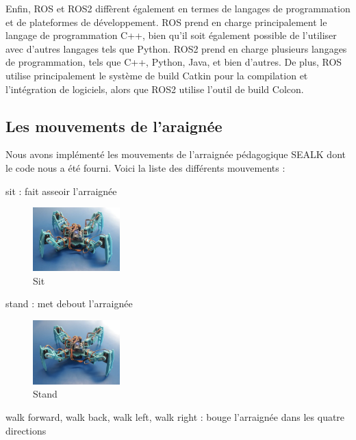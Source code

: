 Enfin, ROS et ROS2 diffèrent également en termes de langages de programmation et de plateformes de développement. 
ROS prend en charge principalement le langage de programmation C++, bien qu'il soit également possible de l'utiliser avec d'autres 
langages tels que Python. ROS2 prend en charge plusieurs langages de programmation, tels que C++, Python, Java, et bien d'autres. 
De plus, ROS utilise principalement le système de build Catkin pour la compilation et l'intégration de logiciels, alors que 
ROS2 utilise l'outil de build Colcon. 

			\subsection{Les mouvements de l'araignée}
			\label{les_mouvements}

Nous avons implémenté les mouvements de l'arraignée pédagogique SEALK dont le code nous a été fourni. Voici la liste des différents mouvements :	

sit : fait asseoir l'arraignée

\begin{figure}[H]
	\begin{center}
		\includegraphics[width=0.3\textwidth]{./img/sit}
		\caption{Sit}
	\end{center}
\end{figure}

stand : met debout l'arraignée

\begin{figure}[H]
	\begin{center}
		\includegraphics[width=0.3\textwidth]{./img/stand}
		\caption{Stand}
	\end{center}
\end{figure}

walk forward, walk back, walk left, walk right : bouge l'arraignée dans les quatre directions

